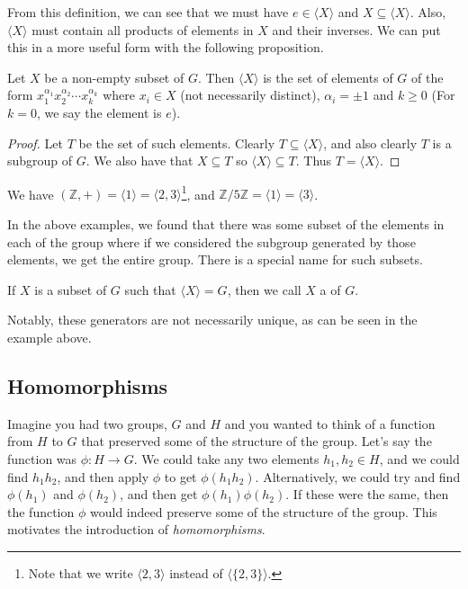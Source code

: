 \documentclass[a4paper]{scrartcl}
\begin{document}
From this definition, we can see that we must have $e \in \langle X \rangle$ and $X \subseteq \langle X\rangle$. Also, $\langle X \rangle$ must contain all products of elements in $X$ and their inverses.
We can put this in a more useful form with the following proposition.

\begin{proposition}
	Let $X$ be a non-empty subset of $G$. Then $\langle X \rangle$ is the set of elements of $G$ of the form 
	$x_1^{\alpha_1} x_2^{\alpha_2} \cdots x_k^{\alpha_k}$ where $x_i \in X$ (not necessarily distinct), $\alpha_i = \pm 1$ and $k \geq 0$
	(For $k = 0$, we say the element is $e$).
\end{proposition}
\begin{proof}
	Let $T$ be the set of such elements. Clearly $T \subseteq \langle X \rangle$, and also clearly $T$ is a subgroup of $G$. We also have that $X \subseteq T$ so $\langle X \rangle \subseteq T$. Thus $T = \langle X \rangle$.
\end{proof}
  
\begin{example}
	We have $(\mathbb{Z}, +) = \langle 1 \rangle = \langle 2, 3 \rangle$\footnote{Note that we write $\langle 2, 3\rangle$ instead of $\langle \{2, 3\} \rangle$.}, and $\mathbb{Z}/5\mathbb{Z} = \langle 1 \rangle = \langle 3 \rangle$.
\end{example}

In the above examples, we found that there was some subset of the elements in each of the group where if we considered the subgroup generated by those elements, we get the entire group.
There is a special name for such subsets.

\begin{definition}[Generators]\label{def:generator}
	If $X$ is a subset of $G$ such that $\langle X \rangle = G$, then we call $X$ a  of $G$.
\end{definition}

Notably, these generators are not necessarily unique, as can be seen in the example above.


\subsection{Homomorphisms}

Imagine you had two groups, $G$ and $H$ and you wanted to think of a function from $H$ to $G$ that preserved some of the structure of the group.
Let's say the function was $\phi : H \rightarrow G$. We could take any two elements $h_1, h_2 \in H$, and we could find $h_1 h_2$, and then apply $\phi$ to get $\phi(h_1 h_2)$.
Alternatively, we could try and find $\phi(h_1)$ and $\phi(h_2)$, and then get $\phi(h_1) \phi(h_2)$. If these were the same, then the function $\phi$ would indeed preserve some of the structure of the group. This motivates the introduction of \emph{homomorphisms}.
\end{document}
